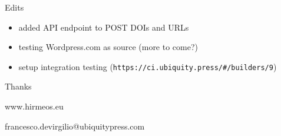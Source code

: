 \documentclass[xcolor=svgnames]{beamer}
\begin{document}
    \begin{frame}{Edits}
        \begin{itemize}
            \item added API endpoint to POST DOIs and URLs
            \item testing Wordpress.com as source (more to come?)
            \item setup integration testing (\texttt{https://ci.ubiquity.press/\#/builders/9})
        \end{itemize}
    \end{frame}

    \begin{frame}{Thanks}
        \begin{center}
            \Huge{www.hirmeos.eu}
        \end{center}
        \vspace{0.5\textheight}
        \begin{center}
            \Large{francesco.devirgilio@ubiquitypress.com}
        \end{center}
    \end{frame}
\end{document}
